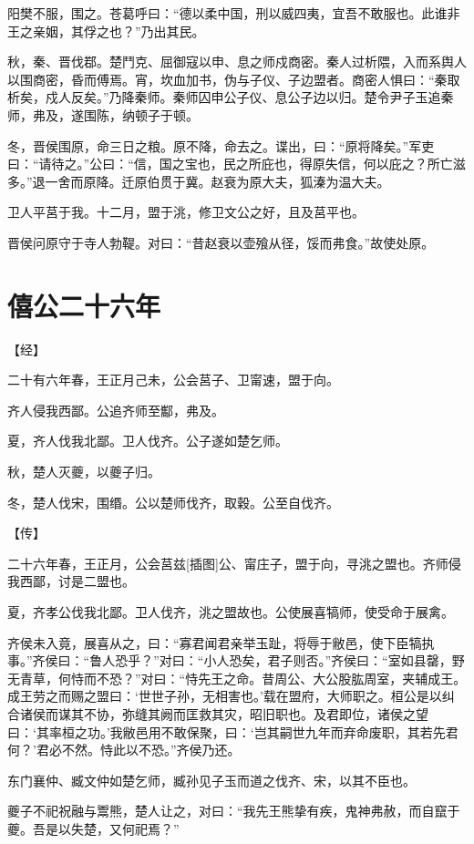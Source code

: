 \documentclass[a4paper,12pt,UTF8,twoside]{ctexbook}
\begin{document}
阳樊不服，围之。苍葛呼曰：“德以柔中国，刑以威四夷，宜吾不敢服也。此谁非王之亲姻，其俘之也？”乃出其民。

秋，秦、晋伐鄀。楚鬥克、屈御寇以申、息之师戍商密。秦人过析隈，入而系舆人以围商密，昏而傅焉。宵，坎血加书，伪与子仪、子边盟者。商密人惧曰：“秦取析矣，戍人反矣。”乃降秦师。秦师囚申公子仪、息公子边以归。楚令尹子玉追秦师，弗及，遂围陈，纳顿子于顿。

冬，晋侯围原，命三日之粮。原不降，命去之。谍出，曰：“原将降矣。”军吏曰：“请待之。”公曰：“信，国之宝也，民之所庇也，得原失信，何以庇之？所亡滋多。”退一舍而原降。迁原伯贯于冀。赵衰为原大夫，狐溱为温大夫。

卫人平莒于我。十二月，盟于洮，修卫文公之好，且及莒平也。

晋侯问原守于寺人勃鞮。对曰：“昔赵衰以壶飱从径，馁而弗食。”故使处原。


\chapter{僖公二十六年}



【经】

二十有六年春，王正月己未，公会莒子、卫甯速，盟于向。

齐人侵我西鄙。公追齐师至酅，弗及。

夏，齐人伐我北鄙。卫人伐齐。公子遂如楚乞师。

秋，楚人灭夔，以夔子归。

冬，楚人伐宋，围缗。公以楚师伐齐，取穀。公至自伐齐。

【传】

二十六年春，王正月，公会莒兹[插图]公、甯庄子，盟于向，寻洮之盟也。齐师侵我西鄙，讨是二盟也。

夏，齐孝公伐我北鄙。卫人伐齐，洮之盟故也。公使展喜犒师，使受命于展禽。

齐侯未入竟，展喜从之，曰：“寡君闻君亲举玉趾，将辱于敝邑，使下臣犒执事。”齐侯曰：“鲁人恐乎？”对曰：“小人恐矣，君子则否。”齐侯曰：“室如县罄，野无青草，何恃而不恐？”对曰：“恃先王之命。昔周公、大公股肱周室，夹辅成王。成王劳之而赐之盟曰：‘世世子孙，无相害也。’载在盟府，大师职之。桓公是以纠合诸侯而谋其不协，弥缝其阙而匡救其灾，昭旧职也。及君即位，诸侯之望曰：‘其率桓之功。’我敝邑用不敢保聚，曰：‘岂其嗣世九年而弃命废职，其若先君何？’君必不然。恃此以不恐。”齐侯乃还。

东门襄仲、臧文仲如楚乞师，臧孙见子玉而道之伐齐、宋，以其不臣也。

夔子不祀祝融与鬻熊，楚人让之，对曰：“我先王熊挚有疾，鬼神弗赦，而自竄于夔。吾是以失楚，又何祀焉？”
\end{document}

